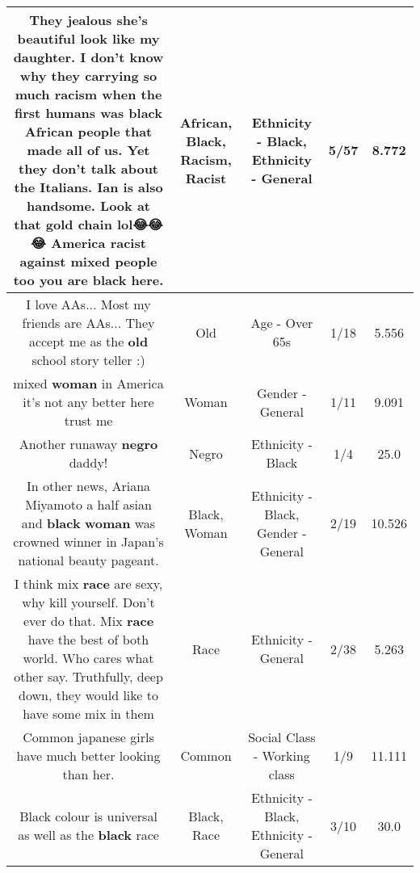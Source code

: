 \documentclass[11pt]{article}
\newlength\mylength
\begin{document}
\begin{center}
\begin{longtable}{|C{.65\mylength}|C{.30\mylength}|C{.12\mylength}|C{.12\mylength}|C{.12\mylength}|}
  \small They jealous she's beautiful look like my daughter. I don't know why they carrying so much \textbf{racism} when the first humans was \textbf{black} \textbf{African} people that made all of us. Yet they don't talk about the Italians. Ian is also handsome. Look at that gold chain lol😂😂😂 America \textbf{racist} against mixed people too you are \textbf{black} here.\normalsize   & African, Black, Racism, Racist & Ethnicity - Black, Ethnicity - General & 5/57 & 8.772 \\  \hline
  \small I love AAs... Most my friends are AAs... They accept me as the \textbf{old} school story teller :)\normalsize   & Old & Age - Over 65s & 1/18 & 5.556 \\  \hline
  \small mixed \textbf{woman} in America it's not any better here trust me\normalsize   & Woman & Gender - General & 1/11 & 9.091 \\  \hline
  \small Another runaway \textbf{negro} daddy!\normalsize   & Negro & Ethnicity - Black & 1/4 & 25.0 \\  \hline
  \small In other news, Ariana Miyamoto a half asian and \textbf{black} \textbf{woman} was crowned winner in Japan's national beauty pageant.\normalsize   & Black, Woman & Ethnicity - Black, Gender - General & 2/19 & 10.526 \\  \hline
  \small I think mix \textbf{race} are sexy, why kill yourself.  Don't ever do that.  Mix \textbf{race} have the best of both world.  Who cares what other say.  Truthfully, deep down, they would like to have some mix in them\normalsize   & Race & Ethnicity - General & 2/38 & 5.263 \\  \hline
  \small Common japanese girls have much better looking than her.\normalsize   & Common & Social Class - Working class & 1/9 & 11.111 \\  \hline
  \small Black colour is universal as well as the \textbf{black} race\normalsize   & Black, Race & Ethnicity - Black, Ethnicity - General & 3/10 & 30.0 \\  \hline

\end{longtable}
\end{center}
\end{document}
